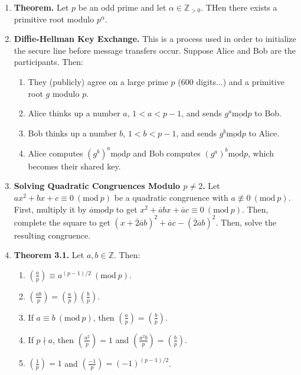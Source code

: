 \documentclass[11pt]{article}
\theoremstyle{definition}
\theoremstyle{named}
\newcommand{\Mod}[1]{\ (\mathrm{mod}\ #1)}
\begin{document}
\begin{enumerate}
\begin{enumerate}
    \end{enumerate}
    \item \textbf{Theorem. } Let $p$ be an odd prime and let $\alpha \in \mathbb{Z}_{>0}$. THen there exists a primitive root modulo $p^\alpha$. 
    \item \textbf{Diffie-Hellman Key Exchange. } This is a process used in order to initialize the secure line before message transfers occur. Suppose Alice and Bob are the participants. Then: 
    \begin{enumerate}
        \item They (publicly) agree on a large prime $p$ (600 digits...) and a primitive root $g$ modulo $p$. 
        \item Alice thinks up a number $a$, $1 < a < p-1$, and sends $g^a \underline{\textrm{mod}} p$ to Bob. 
        \item Bob thinks up a number $b$, $1 < b < p-1$, and sends $g^b \underline{\textrm{mod}} p$ to Alice. 
        \item Alice computes $(g^b)^a \underline{\textrm{mod}} p$ and Bob computes $(g^a)^b \underline{\textrm{mod}} p$, which becomes their shared key. 
    \end{enumerate}
    \item \textbf{Solving Quadratic Congruences Modulo $p \neq 2$. } Let $ax^2 + bx + c \equiv 0 \Mod{p}$ be a quadratic congruence with $a \not\equiv 0 \Mod{p}$. First, multiply it by $\overline{a} \underline{\textrm{mod}} p$ to get $x^2 + \overline{a}bx + \overline{a}c \equiv 0 \Mod{p}$. Then, complete the square to get $(x + \overline{2}\overline{a}b)^2 + \overline{a}c - (\overline{2}\overline{a}b)^2$. Then, solve the resulting congruence. 
    \item \textbf{Theorem 3.1. } Let $a,b \in \mathbb{Z}$. Then: 
    \begin{enumerate}
        \item $\left(\frac{a}{p}\right) \equiv a^{(p-1)/2} \Mod{p}$. 
        \item $\left(\frac{ab}{p}\right) = \left(\frac{a}{p}\right)\left(\frac{b}{p}\right)$. 
        \item If $a \equiv b \Mod{p}$, then $\left(\frac{a}{p}\right) = \left(\frac{b}{p}\right)$. 
        \item If $p \nmid a$, then $\left(\frac{a^2}{p}\right) = 1$ and $\left(\frac{a^2b}{p}\right) = \left(\frac{b}{p}\right)$. 
        \item $\left(\frac{1}{p}\right) = 1$ and $\left(\frac{-1}{p}\right) = (-1)^{(p-1)/2}$. 
    \end{enumerate}

\end{enumerate}
\end{document}
